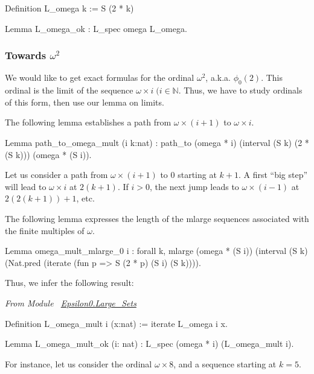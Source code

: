 \begin{Coqsrc}
Definition L_omega k := S (2 * k)%

Lemma L_omega_ok : L_spec omega L_omega.
\end{Coqsrc}

\subsubsection{Towards  \texorpdfstring{$\omega^2$}{omega*omega}}

We would like to get exact formulas for the ordinal $\omega^2$, a.k.a.
$\phi_0(2)$. This ordinal is the limit of the sequence $\omega\times i\;(i \in \mathbb{N}$. Thus, we have to study ordinals of this form, then use 
our lemma on limits.

The following lemma establishes a path from $\omega\times ( i+1)$ to
$\omega \times i$.

\begin{Coqsrc}
Lemma path_to_omega_mult (i k:nat) :
  path_to (omega * i) (interval (S k) (2 * (S k))) (omega * (S i)).
\end{Coqsrc}

Let us consider a path from  $\omega\times(i+1)$ to $0$ starting at $k+1$.
A first ``big step'' will lead to $\omega\times i$ at $2(k+1)$. If $i>0$, the
next jump leads to $\omega\times(i-1)$ at $2(2(k+1))+1$, etc.

The following lemma expresses the length of the mlarge sequences associated with the finite multiples of $\omega$.


\begin{Coqsrc}
Lemma omega_mult_mlarge_0 i  : forall k,
    mlarge  (omega * (S i))
            (interval (S k)
                      (Nat.pred (iterate (fun p =>  S (2 * p)%
                                         (S i)
                                         (S k)))).
\end{Coqsrc}

Thus, we infer the following result:

\emph{From Module~ \href{../theories/html/hydras.Epsilon0.Large_Sets.html\#L_omega_mult}{Epsilon0.Large\_Sets}}

\begin{Coqsrc}
Definition L_omega_mult i (x:nat) :=  iterate L_omega i x.

Lemma L_omega_mult_ok (i: nat) :  L_spec (omega * i) (L_omega_mult i).
\end{Coqsrc}

For instance, let us consider the ordinal $\omega\times 8$, and a sequence 
starting at $k=5$.

